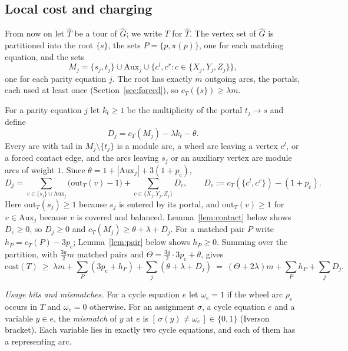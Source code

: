 \documentclass[11pt]{amsart}
\theoremstyle{definition}
\theoremstyle{remark}
\numberwithin{equation}{section}
\newcommand{\iv}[1]{[\,#1\,]}
\newcommand{\cost}{\mathrm{cost}}
\newcommand{\Aux}{\mathrm{Aux}}
\newcommand{\pc}{p_{\mathrm{c}}}
\newcommand{\Gh}{\widehat{G}}
\newcommand{\Th}{\widehat{T}}
\begin{document}
\subsection{Local cost and charging}
From now on let $\Th$ be a tour of $\Gh$; we write $T$ for $\Th$. The vertex set of $\Gh$ is partitioned into the root $\{s\}$, the sets $P=\{p,\pi(p)\}$, one for each matching equation, and the sets
\begin{equation}\label{eq:Mj}
M_j=\{s_j,t_j\}\cup\Aux_j\cup\{c^l,c^r: c\in\{X_j,Y_j,Z_j\}\},
\end{equation}
one for each parity equation $j$. The root has exactly $m$ outgoing arcs, the portals, each used at least once (Section~\ref{sec:forced}), so $c_T(\{s\})\ge\lambda m$.

For a parity equation $j$ let $k_t\ge1$ be the multiplicity of the portal $t_j\to s$ and define
\[
D_j=c_T(M_j)-\lambda k_t-\theta .
\]
Every arc with tail in $M_j\setminus\{t_j\}$ is a module arc, a wheel arc leaving a vertex $c^l$, or a forced contact edge, and the arcs leaving $s_j$ or an auxiliary vertex are module arcs of weight $1$. Since $\theta=1+|\Aux_j|+3(1+\pc)$,
\begin{equation}\label{eq:Dsplit}
D_j=\sum_{v\in\{s_j\}\cup\Aux_j}\bigl(\mathrm{out}_T(v)-1\bigr)+\sum_{c\in\{X_j,Y_j,Z_j\}}D_c,\qquad D_c:=c_T(\{c^l,c^r\})-(1+\pc).
\end{equation}
Here $\mathrm{out}_T(s_j)\ge1$ because $s_j$ is entered by its portal, and $\mathrm{out}_T(v)\ge1$ for $v\in\Aux_j$ because $v$ is covered and balanced. Lemma~\ref{lem:contact} below shows $D_c\ge0$, so $D_j\ge0$ and $c_T(M_j)\ge \theta+\lambda+D_j$. For a matched pair $P$ write $h_P=c_T(P)-3\pc$; Lemma~\ref{lem:pair} below shows $h_P\ge0$. Summing over the partition, with $\frac{3g}{2}m$ matched pairs and $\Theta=\frac{3g}{2}\cdot3\pc+\theta$, gives
\begin{equation}\label{eq:budget}
\cost(T)\ \ge\ \lambda m+\sum_P(3\pc+h_P)+\sum_j(\theta+\lambda+D_j)\ =\ (\Theta+2\lambda)m+\sum_Ph_P+\sum_jD_j .
\end{equation}

\emph{Usage bits and mismatches.} For a cycle equation $e$ let $\omega_e=1$ if the wheel arc $\rho_e$ occurs in $T$ and $\omega_e=0$ otherwise. For an assignment $\sigma$, a cycle equation $e$ and a variable $y\in e$, the \emph{mismatch} of $y$ at $e$ is $\iv{\sigma(y)\ne\omega_e}\in\{0,1\}$ (Iverson bracket). Each variable lies in exactly two cycle equations, and each of them has a representing arc.
\end{document}
